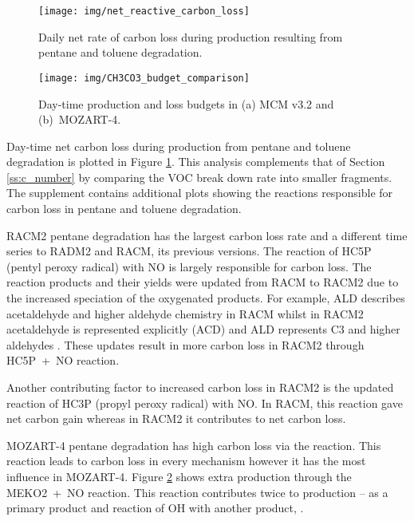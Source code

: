 \begin{figure}
    \centering
    \texttt{[image: img/net\_reactive\_carbon\_loss]}
    \vspace{0mm}
    \caption{Daily net rate of carbon loss during  production resulting from pentane and toluene degradation.}
    \vspace{-4mm}
    \label{f:net_carbon_loss}
\end{figure}

\begin{figure}
    \centering
    \texttt{[image: img/CH3CO3\_budget\_comparison]}
    \vspace{0mm}
    \caption{Day-time  production and loss budgets in (a) MCM v3.2 and \mbox{(b) MOZART-4}.}
    \vspace{-4mm}
    \label{f:CH3CO3_budget}
\end{figure}

Day-time net carbon loss during  production from pentane and toluene degradation is plotted in Figure \ref{f:net_carbon_loss}.
This analysis complements that of Section \ref{ss:c_number} by comparing the VOC break down rate into smaller fragments.
The supplement contains additional plots showing the reactions responsible for carbon loss in pentane and toluene degradation.

RACM2 pentane degradation has the largest carbon loss rate and a different time series to RADM2 and RACM, its previous versions.  
The reaction of HC5P (pentyl peroxy radical) with NO is largely responsible for carbon loss.
The reaction products and their yields were updated from RACM to RACM2 due to the increased speciation of the oxygenated products.
For example, ALD describes acetaldehyde and higher aldehyde chemistry in RACM whilst in RACM2 acetaldehyde is represented explicitly (ACD) and ALD represents C3 and higher aldehydes \citep{Goliff:2013}.
These updates result in more carbon loss in RACM2 through \mbox{HC5P + NO} reaction.

Another contributing factor to increased carbon loss in RACM2 is the updated reaction of HC3P (propyl peroxy radical) with NO.
In RACM, this reaction gave net carbon gain whereas in RACM2 it contributes to net carbon loss.

MOZART-4 pentane degradation has high carbon loss via the  reaction.
This reaction leads to carbon loss in every mechanism however it has the most influence in MOZART-4. 
Figure \ref{f:CH3CO3_budget} shows extra  production through the \mbox{MEKO2 + NO} reaction.
This reaction contributes twice to  production -- as a primary product and reaction of OH with another product, .


